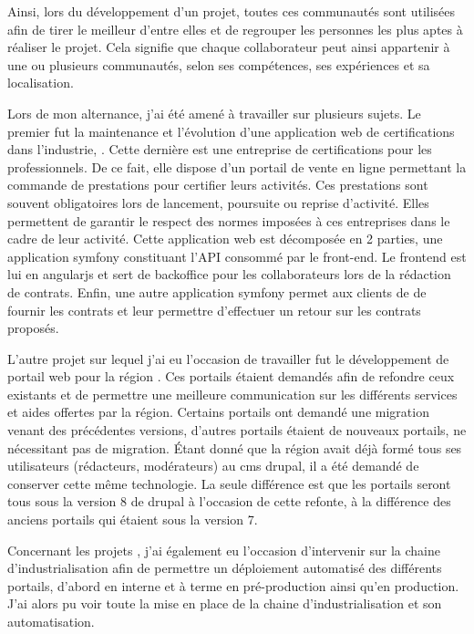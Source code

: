 Ainsi, lors du développement d'un projet, toutes ces communautés sont utilisées afin de tirer le meilleur d'entre elles et de regrouper les personnes les plus aptes à réaliser le projet. Cela signifie que chaque collaborateur peut ainsi appartenir à une ou plusieurs communautés, selon ses compétences, ses expériences et sa localisation. 

Lors de mon alternance, j'ai été amené à travailler sur plusieurs sujets. Le premier fut la maintenance et l'évolution d'une application web de certifications dans l'industrie, \bv. Cette dernière est une entreprise de certifications pour les professionnels. De ce fait, elle dispose d’un portail de vente en ligne permettant la commande de prestations pour certifier leurs activités. Ces prestations sont souvent obligatoires lors de lancement, poursuite ou reprise d'activité. Elles permettent de garantir le respect des normes imposées à ces entreprises dans le cadre de leur activité. Cette application web est décomposée en 2 parties, une application \gls{symfony} constituant l'\gls{API} consommé par le front-end. Le \gls{frontend} est lui en \gls{angularjs} et sert de \gls{backoffice} pour les collaborateurs \bv{} lors de la rédaction de contrats. Enfin, une autre application \gls{symfony} permet aux clients de \bv{} de fournir les contrats et leur permettre d'effectuer un retour sur les contrats proposés.

L'autre projet sur lequel j'ai eu l'occasion de travailler fut le développement de portail web pour la région \naq{}. Ces portails étaient demandés afin de refondre ceux existants et de permettre une meilleure communication sur les différents services et aides offertes par la région. Certains portails ont demandé une migration venant des précédentes versions, d'autres portails étaient de nouveaux portails, ne nécessitant pas de migration. Étant donné que la région avait déjà formé tous ses utilisateurs (rédacteurs, modérateurs) au \gls{cms} \gls{drupal}, il a été demandé de conserver cette même technologie. La seule différence est que les portails seront tous sous la version 8 de \gls{drupal} à l'occasion de cette refonte, à la différence des anciens portails qui étaient sous la version 7. 

Concernant les projets \naq, j'ai également eu l'occasion d'intervenir sur la chaine d'industrialisation afin de permettre un déploiement automatisé des différents portails, d'abord en interne et à terme en pré-production ainsi qu'en production. J'ai alors pu voir toute la mise en place de la chaine d'industrialisation et son automatisation.

